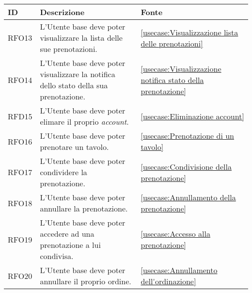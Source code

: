 \begin{table}[H]
	\renewcommand{\arraystretch}{1.5}
	\centering
	\begin{tabularx}{\textwidth}{l|X|p{2cm}}
		\textbf{ID} & \textbf{Descrizione}                                                                                           & \textbf{Fonte}                                                                                                     \\
		\hline
		RFO13       & L'Utente base deve poter visualizzare la lista delle sue prenotazioni.								         & \autoref{usecase:Visualizzazione lista delle prenotazioni} \\
		\hline
		RFO14       & L'Utente base deve poter visualizzare la notifica dello stato della sua prenotazione.                          & \autoref{usecase:Visualizzazione notifica stato della prenotazione}                                                \\
		\hline
		RFD15       & L'Utente base deve poter elimare il proprio \textit{account}.                                                  & \autoref{usecase:Eliminazione account}                                                                             \\
		\hline
		RFO16       & L'Utente base deve poter prenotare un tavolo.                                                                  & \autoref{usecase:Prenotazione di un tavolo}                                                                        \\
		\hline
		RFO17       & L'Utente base deve poter condividere la prenotazione.                                                          & \autoref{usecase:Condivisione della prenotazione}                                                                  \\
		\hline
		RFO18       & L'Utente base deve poter annullare la prenotazione.                                                            & \autoref{usecase:Annullamento della prenotazione}                                                                  \\
		\hline
		RFO19       & L'Utente base deve poter accedere ad una prenotazione a lui condivisa.										 & \autoref{usecase:Accesso alla prenotazione}                                                                        \\
		\hline
		RFO20       & L'Utente base deve poter annullare il proprio ordine.                                                          & \autoref{usecase:Annullamento dell'ordinazione}                                                                    \\

\end{tabularx}
\end{table}
